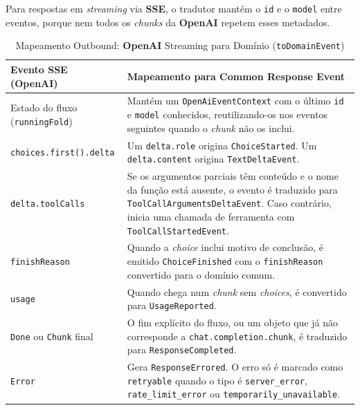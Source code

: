     Para respostas em \textit{streaming} via \textbf{SSE}, o tradutor mantém o \texttt{id} e o \texttt{model} entre eventos, porque nem todos os \textit{chunks} da \textbf{OpenAI} repetem esses metadados.

    \begin{table}[H]
        \centering
        \footnotesize
        \renewcommand{\arraystretch}{1.25}
        \begin{tabularx}{\textwidth}{|>{\raggedright\arraybackslash}p{4cm}|Y|}
            \hline
            \textbf{Evento SSE (OpenAI)} & \textbf{Mapeamento para Common Response Event} \\
            \hline
            Estado do fluxo (\texttt{runningFold}) & Mantém um \texttt{OpenAiEventContext} com o último \texttt{id} e \texttt{model} conhecidos, reutilizando-os nos eventos seguintes quando o \textit{chunk} não os inclui. \\
            \hline
            \texttt{choices.first().delta} & Um \texttt{delta.role} origina \texttt{ChoiceStarted}. Um \texttt{delta.content} origina \texttt{TextDeltaEvent}. \\
            \hline
            \texttt{delta.toolCalls} & Se os argumentos parciais têm conteúdo e o nome da função está ausente, o evento é traduzido para \texttt{ToolCallArgumentsDeltaEvent}. Caso contrário, inicia uma chamada de ferramenta com \texttt{ToolCallStartedEvent}. \\
            \hline
            \texttt{finishReason} & Quando a \textit{choice} inclui motivo de conclusão, é emitido \texttt{ChoiceFinished} com o \texttt{finishReason} convertido para o domínio comum. \\
            \hline
            \texttt{usage} & Quando chega num \textit{chunk} sem \textit{choices}, é convertido para \texttt{UsageReported}. \\
            \hline
            \texttt{Done} ou \texttt{Chunk} final & O fim explícito do fluxo, ou um objeto que já não corresponde a \texttt{chat.completion.chunk}, é traduzido para \texttt{ResponseCompleted}. \\
            \hline
            \texttt{Error} & Gera \texttt{ResponseErrored}. O erro só é marcado como \texttt{retryable} quando o tipo é \texttt{server\_error}, \texttt{rate\_limit\_error} ou \texttt{temporarily\_unavailable}. \\
            \hline
        \end{tabularx}
        \caption{Mapeamento Outbound: \textbf{OpenAI} Streaming para Domínio (\texttt{toDomainEvent})}
    \end{table}

